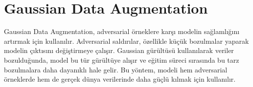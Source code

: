 \section{Gaussian Data Augmentation}

Gaussian Data Augmentation, adversarial örneklere karşı modelin sağlamlığını artırmak için kullanılır. Adversarial saldırılar, özellikle küçük bozulmalar yaparak modelin çıktısını değiştirmeye çalışır. Gaussian gürültüsü kullanılarak veriler bozulduğunda, model bu tür gürültüye alışır ve eğitim süreci sırasında bu tarz bozulmalara daha dayanıklı hale gelir. Bu yöntem, modeli hem adversarial örneklerde hem de gerçek dünya verilerinde daha güçlü kılmak için kullanılır.

\newpage